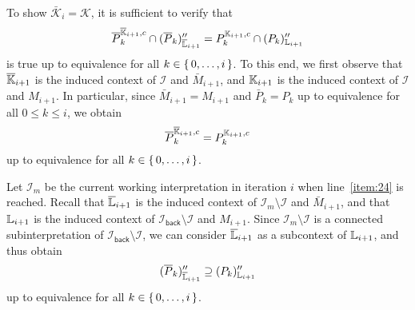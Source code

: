 \begin{Proof}
  To show $\bar{\mathcal{K}}_{i} = \mathcal{K}$, it is sufficient to verify that
  \begin{equation}
    \label{eq:56}
    \overline P_{k}^{\overline{{\mathbb{K}}}_{i+1}, c} \cap (\overline P_{k})_{\overline{{\mathbb{L}}}_{i+1}}'' =
    P_{k}^{{\mathbb{K}}_{i+1}, c} \cap (P_{k})_{{\mathbb{L}}_{i+1}}''
  \end{equation}
  is true up to equivalence for all $k \in {\ensuremath{\{\, 0, \dots, i \,\}}}$.  To this end, we first
  observe that $\overline{{\mathbb{K}}}_{i+1}$ is the induced context of $\mathcal{I}$ and $\bar
  M_{i+1}$, and ${\mathbb{K}}_{i+1}$ is the induced context of $\mathcal{I}$ and $M_{i+1}$.  In
  particular, since $\bar M_{i+1} = M_{i+1}$ and $\bar P_{k} = P_{k}$ up to equivalence
  for all $0 \leq k \leq i$, we obtain
  \begin{equation*}
    \overline P_{k}^{\overline{{\mathbb{K}}}_{i+1}, c} = P_{k}^{{\mathbb{K}}_{i+1}, c}
  \end{equation*}
  up to equivalence for all $k \in {\ensuremath{\{\, 0, \dots, i \,\}}}$.

  Let $\mathcal{I}_{m}$ be the current working interpretation in iteration $i$ when
  line~\ref{item:24} is reached.  Recall that $\overline{{\mathbb{L}}}_{i+1}$ is the induced context
  of $\mathcal{I}_{m} \setminus \mathcal{I}$ and $\bar M_{i+1}$, and that ${\mathbb{L}}_{i+1}$
  is the induced context of $\mathcal{I}_{\mathsf{back}} \setminus \mathcal{I}$ and
  $M_{i+1}$.  Since $\mathcal{I}_{m} \setminus \mathcal{I}$ is a connected
  subinterpretation of $\mathcal{I}_{\mathsf{back}} \setminus \mathcal{I}$, we can
  consider $\overline{{\mathbb{L}}}_{i+1}$ as a subcontext of ${\mathbb{L}}_{i+1}$, and thus obtain
  \begin{equation*}
    (\overline P_{k})_{\overline{{\mathbb{L}}}_{i+1}}'' \supseteq (P_{k})_{{\mathbb{L}}_{i+1}}''
  \end{equation*}
  up to equivalence for all $k \in {\ensuremath{\{\, 0, \dots, i \,\}}}$.


\end{Proof}
